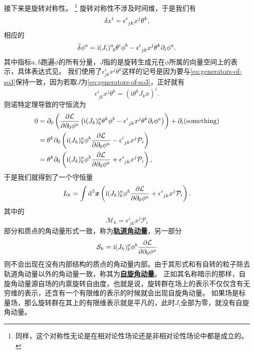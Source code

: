\documentclass[hyperref, UTF8, a4paper]{ctexart}
\newcommand*{\ii}{\mathrm{i}}
\renewcommand{\autoref}{\prettyref}
\newcommand{\concept}[1]{\underline{\textbf{#1}}}
\begin{document}
接下来是旋转对称性。%
\footnote{同样，这个对称性无论是在相对论性场论还是非相对论性场论中都是成立的。}%
旋转对称性不涉及时间维，于是我们有
\[
    \var{x^i} = \epsilon^i_{\ jk}  x^j \theta^k,
\]
相应的
\[
    \bar{\var}{\phi^a} = \ii (J_i)^a_{\ b} \theta^i \phi^b - \epsilon^i_{\ jk}  x^j \theta^k \partial_i \phi^a.
\]
其中指标$a,b$跑遍$\phi$的所有分量，$J$指的是旋转生成元在$\phi$所属的向量空间上的表示，具体表达式见\autoref{sec:rotation}。
我们使用了$\epsilon^i_{jk}  x^j \theta^k$这样的记号是因为要与\eqref{eq:generators-of-so3}保持一致，因为若取$J$为\eqref{eq:generators-of-so3}，正好就有
\[
    \epsilon^i_{\ jk}  x^j \theta^k = (\ii \theta^k J_k x)^i.
\]
则诺特定理导致的守恒流为
\[
    \begin{aligned}
        0 &= \partial_0 \left( \pdv{\mathcal{L}}{\partial_0 \phi^a} \left( \ii (J_k)^a_b \theta^k \phi^b - \epsilon^i_{\ jk}  x^j \theta^k \partial_i \phi^a \right) \right) + \partial_i (\text{something}) \\
        &= \theta^k \partial_0 \left( \ii (J_k)^a_b \phi^b \pdv{\mathcal{L}}{\partial_0 \phi^a} - \epsilon^i_{\ jk} x^j \mathcal{P}_i \right) \\
        &= \theta^k \partial_0 \left( \ii (J_k)^a_b \phi^b \pdv{\mathcal{L}}{\partial_0 \phi^a} + \epsilon^i_{\ jk} x^j \mathcal{P}_i \right),
    \end{aligned}
\]
于是我们就得到了一个守恒量 %
\begin{equation}
    L_k = \int \dd[3]{\vb*{x}} \left( \ii (J_k)^a_b \phi^b \pdv{\mathcal{L}}{\partial_0 \phi^a} + \epsilon^i_{\ jk} x^j \mathcal{P}_i \right).
    \label{eq:field-angular-momentum}
\end{equation}
其中的
\begin{equation}
    \mathcal{M}_k = \epsilon^i_{\ jk} x^j \mathcal{P}_i 
\end{equation}
部分和质点的角动量形式一致，称为\concept{轨道角动量}，另一部分
\begin{equation}
    \mathcal{S}_k = \ii (J_k)^a_b \phi^b \pdv{\mathcal{L}}{\partial_0 \phi^a}
    \label{eq:spin-angular-momentum}
\end{equation}
则不会出现在没有内部结构的质点的角动量内部。由于其形式和有自转的粒子除去轨道角动量以外的角动量一致，称其为\concept{自旋角动量}。
正如其名称暗示的那样，自旋角动量源自场的内禀旋转自由度，也就是说，旋转群在场上的表示不仅仅含有无穷维的表示，还含有一个有限维的表示的时候就会出现自旋角动量。
如果场是标量场，那么旋转群在其上的有限维表示就是平凡的，此时$J_i$全部为零，就没有自旋角动量。
\end{document}
